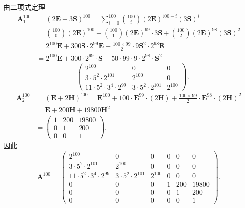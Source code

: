 \documentclass[../../main.tex]{subfiles}
\begin{document}
\begin{solution}
\[\]
由二项式定理
\[
\begin{aligned}
\boldsymbol{A}_1^{100} &= (2\boldsymbol{E} + 3\boldsymbol{S})^{100} = \sum_{i=0}^{100} \binom{100}{i} (2\boldsymbol{E})^{100 - i} (3\boldsymbol{S})^i \\
&= \binom{100}{0} (2\boldsymbol{E})^{100} + \binom{100}{1} (2\boldsymbol{E})^{99} \cdot 3\boldsymbol{S} + \binom{100}{2} (2\boldsymbol{E})^{98} (3\boldsymbol{S})^2 \\
&= 2^{100}\boldsymbol{E} + 300\boldsymbol{S} \cdot 2^{99}\boldsymbol{E} + \frac{100 \times 99}{2} \cdot 9\boldsymbol{S}^2 \cdot 2^{98}\boldsymbol{E} \\
&= 2^{100}\boldsymbol{E} + 300 \cdot 2^{99} \cdot \boldsymbol{S} + 50 \cdot 99 \cdot 9 \cdot 2^{98} \cdot \boldsymbol{S}^2
\end{aligned}
\]
\[
= \begin{pmatrix} 2^{100} & 0 & 0 \\ 3 \cdot 5^2 \cdot 2^{101} & 2^{100} & 0 \\ 11 \cdot 5^2 \cdot 3^4 \cdot 2^{99} & 3 \cdot 5^2 \cdot 2^{101} & 2^{100} \end{pmatrix},
\]
\[
\begin{aligned}
\boldsymbol{A}_2^{100} &= (\boldsymbol{E} + 2\boldsymbol{H})^{100} = \boldsymbol{E}^{100} + 100 \cdot \boldsymbol{E}^{99} \cdot (2\boldsymbol{H}) + \frac{100 \times 99}{2} \cdot \boldsymbol{E}^{98} \cdot (2\boldsymbol{H})^2 \\
&= \boldsymbol{E} + 200\boldsymbol{H} + 19800\boldsymbol{H}^2 \\
&= \begin{pmatrix} 1 & 200 & 19800 \\ 0 & 1 & 200 \\ 0 & 0 & 1 \end{pmatrix}.
\end{aligned}
\]
因此
\[
\boldsymbol{A}^{100} = \begin{pmatrix} 2^{100} & 0 & 0 & 0 & 0 & 0 \\ 3 \cdot 5^2 \cdot 2^{101} & 2^{100} & 0 & 0 & 0 & 0 \\ 11 \cdot 5^2 \cdot 3^4 \cdot 2^{99} & 3 \cdot 5^2 \cdot 2^{101} & 2^{100} & 0 & 0 & 0 \\ 0 & 0 & 0 & 1 & 200 & 19800 \\ 0 & 0 & 0 & 0 & 1 & 200 \\ 0 & 0 & 0 & 0 & 0 & 1 \end{pmatrix}.
\]

\end{solution}
\end{document}
